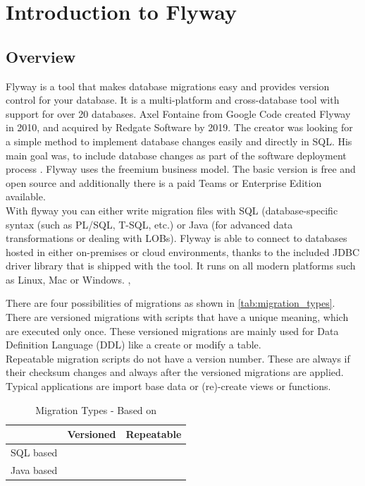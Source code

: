 

\chapter{Introduction to Flyway}


\section{Overview}
%
Flyway is a tool that makes database migrations easy and provides version control for your database. It is a multi-platform and cross-database tool with support for over 20 databases.
Axel Fontaine from Google Code created Flyway in 2010, and acquired by Redgate Software by 2019. The creator was looking for a simple method to implement database changes easily and directly in SQL. His main goal was, to include database changes as part of the software deployment process \cite{Robles2021}.
Flyway uses the freemium business model.  The basic version is free and open source \cite{Fontaine2010} and additionally there is a paid Teams or Enterprise Edition available.\\
With flyway you can either write migration files with SQL (database-specific syntax (such as PL/SQL, T-SQL, etc.) or Java (for advanced data transformations or dealing with LOBs). Flyway is able to connect to databases hosted in either on-premises or cloud environments, thanks to the included JDBC driver library that is shipped with the tool. It runs on all modern platforms such as Linux, Mac or Windows.  \cite{Dillon2022}, \cite{DBMSTools}


%
There are four possibilities of migrations as shown in \autoref{tab:migration_types}. There are versioned migrations with scripts that have a unique meaning, which are executed only once. These versioned migrations are mainly used for Data Definition Language (DDL) like a create or modify a table. \\

Repeatable migration scripts do not have a version number. These are always if their checksum changes and always after the versioned migrations are applied. Typical applications are import base data or (re)-create views or functions.

\begin{table}[h]
	\centering
	\begin{tabularx}{8cm}{X|c c}
		& Versioned & Repeatable \\ \hline
		SQL based & \checkmark & \checkmark \\
		Java based & \checkmark & \checkmark \\
	\end{tabularx}
	\caption{Migration Types - Based on \cite{Parsick2018}}
	\label{tab:migration_types}
\end{table}


